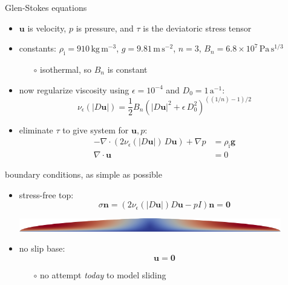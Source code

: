 \documentclass[10pt,
               hyperref={colorlinks,citecolor=DeepPink4,linkcolor=black,urlcolor=blue},
               svgnames]{beamer}
\newcommand{\bn}{\mathbf{n}}
\newcommand{\bu}{\mathbf{u}}
\newcommand{\bzero}{\mathbf{0}}
\newcommand{\Div}{\nabla\cdot}
\newcommand{\eps}{\epsilon}
\newcommand{\rhoi}{\rho_{\text{i}}}
\begin{document}
\begin{frame}{Glen-Stokes equations}
\bigskip
\begin{itemize}
\item $\bu$ is velocity, $p$ is pressure, and $\tau$ is the deviatoric stress tensor
\item constants: {\small $\rhoi=910 \,\text{kg}\,\text{m}^{-3}$, $g=9.81\,\text{m}\,\text{s}^{-2}$, $n=3$, $B_n=6.8\times 10^7\,\text{Pa}\,\text{s}^{1/3}$}
    \begin{itemize}
    \item[$\circ$] isothermal, so $B_n$ is constant
    \end{itemize}
\item now regularize viscosity using $\eps = 10^{-4}$ and $D_0 = 1\,\text{a}^{-1}$:
\begin{equation*}
\nu_\eps(|D\bu|) = \frac{1}{2} B_n \left(|D\bu|^2 + \eps\, D_0^2\right)^{((1/n) - 1)/2}
\end{equation*}
\item eliminate $\tau$ to give system for $\bu,p$:
\begin{align*}
- \nabla \cdot \left(2 \nu_\eps(|D\bu|)\, D\bu\right) + \nabla p &= \rhoi \mathbf{g} \\
\Div \bu &= 0
\end{align*}
\end{itemize}
\end{frame}


\begin{frame}{boundary conditions, as simple as possible}

\begin{itemize}
\item stress-free top:
\begin{equation*}
\sigma \bn = \left(2 \nu_\eps(|D\bu|) D\bu - pI\right) \bn = \bzero
\end{equation*}

\bigskip
\includegraphics[width=0.9\textwidth]{figs/speed.png}

\bigskip
\item no slip base:
\begin{equation*}
\bu = \bzero
\end{equation*}
    \begin{itemize}
    \item[$\circ$] no attempt \emph{today} to model sliding
    \end{itemize}
\end{itemize}
\end{frame}
\end{document}
